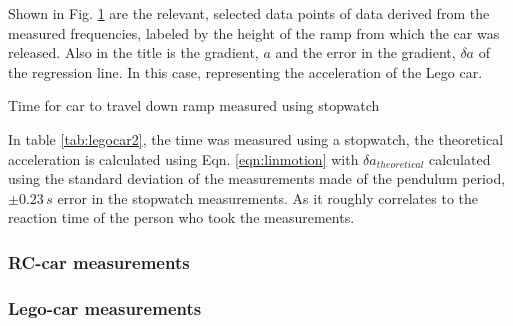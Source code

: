 \documentclass[11pt,a4paper]{article}
\begin{document}
\begin{figure}[H]
      \caption{}%
      \label{fig:legocar}%
    \end{figure}

    Shown in Fig. \ref{fig:legocar} are the relevant, selected data points of data derived from the measured frequencies, labeled by the height of the ramp from which the car was released. Also in the title is the gradient, $a$ and the error in the gradient, $\delta a$ of the regression line. In this case, representing the acceleration of the Lego car. 
  
  \begin{table}[H]
    \center
    \caption{Time for car to travel down ramp measured using stopwatch}
    \label{tab:legocar2}
    
  \end{table}

  In table \ref{tab:legocar2}, the time was measured using a stopwatch, the theoretical acceleration is calculated using Eqn. \ref{eqn:linmotion} with $\delta a_{theoretical}$ calculated using the standard deviation of the measurements made of the pendulum period, $\pm0.23\,s$ error in the stopwatch measurements. As it roughly correlates to the reaction time of the person who took the measurements.



  \subsubsection{RC-car measurements}
      \subsubsection{Lego-car measurements}
\end{document}
